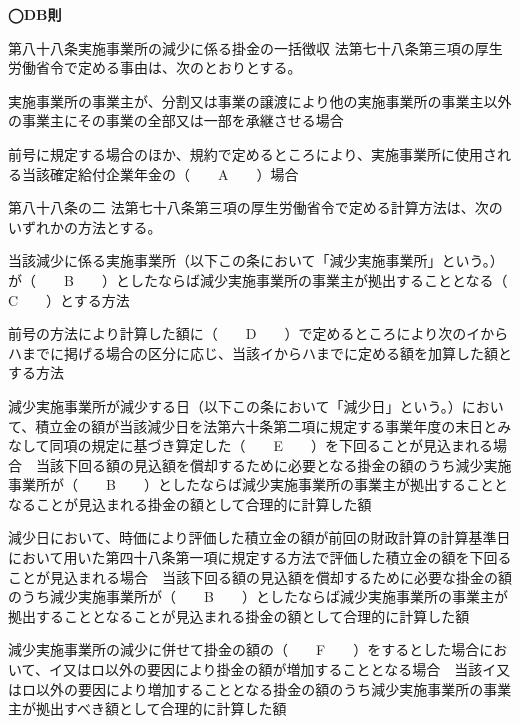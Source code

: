 \begin{fillblank}[数理人試験 2020 問題1 設問2　\&　年金2 H28 問題1(3)C〜I]
  \noindent \textbf{◯DB則}
  \begin{lawstructure}
    \begin{lawarticle}{第八十八条}{実施事業所の減少に係る掛金の一括徴収}
      法第七十八条第三項の厚生労働省令で定める事由は、次のとおりとする。

      実施事業所の事業主が、分割又は事業の譲渡により他の実施事業所の事業主以外の事業主にその事業の全部又は一部を承継させる場合

      前号に規定する場合のほか、規約で定めるところにより、実施事業所に使用される当該確定給付企業年金の（　　A　　）場合
    \end{lawarticle}


    \begin{lawarticle}{第八十八条の二}{}
      法第七十八条第三項の厚生労働省令で定める計算方法は、次のいずれかの方法とする。

      当該減少に係る実施事業所（以下この条において「減少実施事業所」という。）が（　　B　　）としたならば減少実施事業所の事業主が拠出することとなる（　　C　　）とする方法

      前号の方法により計算した額に（　　D　　）で定めるところにより次のイからハまでに掲げる場合の区分に応じ、当該イからハまでに定める額を加算した額とする方法

      減少実施事業所が減少する日（以下この条において「減少日」という。）において、積立金の額が当該減少日を法第六十条第二項に規定する事業年度の末日とみなして同項の規定に基づき算定した（　　E　　）を下回ることが見込まれる場合　当該下回る額の見込額を償却するために必要となる掛金の額のうち減少実施事業所が（　　B　　）としたならば減少実施事業所の事業主が拠出することとなることが見込まれる掛金の額として合理的に計算した額

      減少日において、時価により評価した積立金の額が前回の財政計算の計算基準日において用いた第四十八条第一項に規定する方法で評価した積立金の額を下回ることが見込まれる場合　当該下回る額の見込額を償却するために必要な掛金の額のうち減少実施事業所が（　　B　　）としたならば減少実施事業所の事業主が拠出することとなることが見込まれる掛金の額として合理的に計算した額

      減少実施事業所の減少に併せて掛金の額の（　　F　　）をするとした場合において、イ又はロ以外の要因により掛金の額が増加することとなる場合　当該イ又はロ以外の要因により増加することとなる掛金の額のうち減少実施事業所の事業主が拠出すべき額として合理的に計算した額


\end{lawarticle}
\end{lawstructure}
\end{fillblank}
